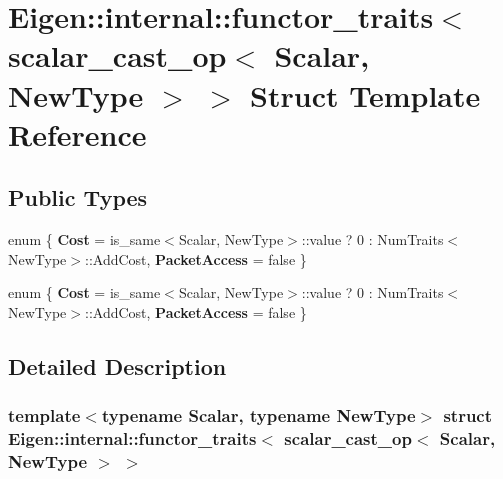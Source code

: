 \hypertarget{struct_eigen_1_1internal_1_1functor__traits_3_01scalar__cast__op_3_01_scalar_00_01_new_type_01_4_01_4}{}\section{Eigen\+:\+:internal\+:\+:functor\+\_\+traits$<$ scalar\+\_\+cast\+\_\+op$<$ Scalar, New\+Type $>$ $>$ Struct Template Reference}
\label{struct_eigen_1_1internal_1_1functor__traits_3_01scalar__cast__op_3_01_scalar_00_01_new_type_01_4_01_4}
\subsection*{Public Types}
\begin{DoxyCompactItemize}
\item 
\mbox{\label{struct_eigen_1_1internal_1_1functor__traits_3_01scalar__cast__op_3_01_scalar_00_01_new_type_01_4_01_4_a27c2723bcdddb58e697c77884b8f58ff}} 
enum \{ {\bfseries Cost} = is\+\_\+same$<$Scalar, New\+Type$>$\+:\+:value ? 0 \+: Num\+Traits$<$New\+Type$>$\+:\+:Add\+Cost, 
{\bfseries Packet\+Access} = false
 \}
\item 
\mbox{\label{struct_eigen_1_1internal_1_1functor__traits_3_01scalar__cast__op_3_01_scalar_00_01_new_type_01_4_01_4_afde15579656274351eb6cfae369235e2}} 
enum \{ {\bfseries Cost} = is\+\_\+same$<$Scalar, New\+Type$>$\+:\+:value ? 0 \+: Num\+Traits$<$New\+Type$>$\+:\+:Add\+Cost, 
{\bfseries Packet\+Access} = false
 \}
\end{DoxyCompactItemize}


\subsection{Detailed Description}
\subsubsection*{template$<$typename Scalar, typename New\+Type$>$\newline
struct Eigen\+::internal\+::functor\+\_\+traits$<$ scalar\+\_\+cast\+\_\+op$<$ Scalar, New\+Type $>$ $>$}



